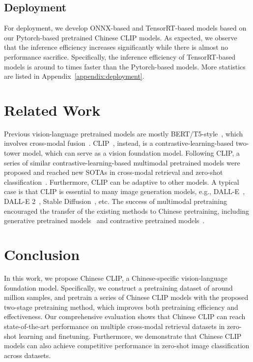 \documentclass[11pt]{article}
\begin{document}
\subsection{Deployment}
For deployment, we develop ONNX-based and TensorRT-based models based on our Pytorch-based pretrained Chinese CLIP models. 
As expected, we observe that the inference efficiency increases significantly while there is almost no performance sacrifice. 
Specifically, the inference efficiency of TensorRT-based models is around  to  times faster than the Pytorch-based models. More statistics are listed in Appendix~\ref{appendix:deployment}.  
\section{Related Work}


Previous vision-language pretrained models are mostly BERT/T5-style~\citep{bert, t5}, which involves cross-modal fusion~\citep{uniter, unicoder-vl, visualbert, vilbert, interbert, oscar, pixelbert, e2e-vlp, vinvl, clipvil, simvlm, ofa, albef, blip, mplug, vlmo, beit3}. 
CLIP~\citep{clip}, instead, is a contrastive-learning-based two-tower model, which can serve as a vision foundation model.  
Following CLIP, a series of similar contrastive-learning-based multimodal pretrained models were proposed and reached new SOTAs in cross-modal retrieval and zero-shot classification~\citep{align, filip, florence}. 
Furthermore, CLIP can be adaptive to other models. 
A typical case is that CLIP is essential to many image generation models, e.g., DALL-E~\citep{dalle}, DALL-E 2~\citep{dalle2}, Stable Diffusion~\citep{latent_diffusion}, etc. 
The success of multimodal pretraining encouraged the transfer of the existing methods to Chinese pretraining, including generative pretrained models~\citep{m6, wenlan, m6-t, m6-10t, ofa} and contrastive pretrained models~\citep{wenlan, wukong, r2d2, altclip}. 


%
 



\section{Conclusion}
In this work, we propose Chinese CLIP, a Chinese-specific vision-language foundation model. 
Specifically, we construct a pretraining dataset of around  million samples, and pretrain a series of Chinese CLIP models with the proposed two-stage pretraining method, which improves both pretraining efficiency and effectiveness. 
Our comprehensive evaluation shows that Chinese CLIP can reach state-of-the-art performance on multiple cross-modal retrieval datasets in zero-shot learning and finetuning. 
Furthermore, we demonstrate that Chinese CLIP models can also achieve competitive performance in zero-shot image classification across  datasets. 
\end{document}
